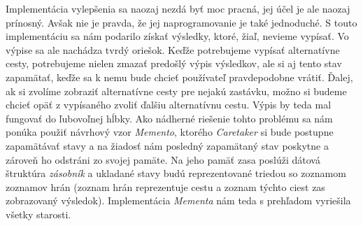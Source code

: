 Implementácia vylepšenia sa naozaj nezdá byť moc pracná, jej účel je ale naozaj prínosný. Avšak nie je pravda, že jej naprogramovanie je také jednoduché. S touto implementáciu sa nám podarilo získať výsledky, ktoré, žiaľ, nevieme vypísať. Vo výpise sa ale nachádza tvrdý oriešok. Keďže potrebujeme vypísať alternatívne cesty, potrebujeme nielen zmazať predošlý výpis výsledkov, ale si aj tento stav zapamätať, keďže sa k nemu bude chcieť používateľ pravdepodobne vrátiť. Ďalej, ak si zvolíme zobraziť alternatívne cesty pre nejakú zastávku, možno si budeme chcieť opäť z vypísaného zvoliť ďalšiu alternatívnu cestu. Výpis by teda mal fungovať do ľubovoľnej hĺbky. Ako nádherné riešenie tohto problému sa nám ponúka použiť návrhový vzor \textit{Memento}, ktorého \textit{Caretaker} si bude postupne zapamätávať stavy a na žiadosť nám posledný zapamätaný stav poskytne a zároveň ho odstráni zo svojej pamäte. Na jeho pamäť zasa poslúži dátová štruktúra \textit{zásobník} a ukladané stavy budú reprezentované triedou so zoznamom zoznamov hrán (zoznam hrán reprezentuje cestu a zoznam týchto ciest zas zobrazovaný výsledok). Implementácia \textit{Mementa} nám teda s prehľadom vyriešila všetky starosti.\newline

